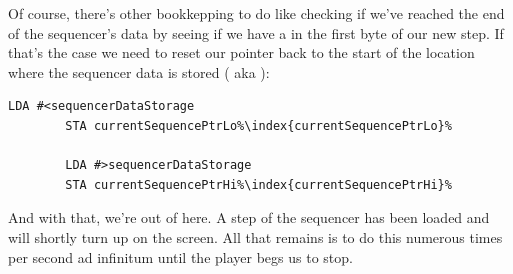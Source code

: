 Of course, there's other bookkepping to do like checking if we've reached the end of the sequencer's data by seeing if we have a  in the first byte of our new step. If that's
the case we need to reset our pointer  back to the start of the location where the sequencer data is stored ( aka ):

\begin{lstlisting}[escapechar=\%]
        LDA #<sequencerDataStorage
        STA currentSequencePtrLo%\index{currentSequencePtrLo}%

        LDA #>sequencerDataStorage
        STA currentSequencePtrHi%\index{currentSequencePtrHi}%
\end{lstlisting}

And with that, we're out of here. A step of the sequencer has been loaded and will shortly turn up on the screen. All that remains is to do this numerous times per second ad infinitum
until the player begs us to stop.



\clearpage


